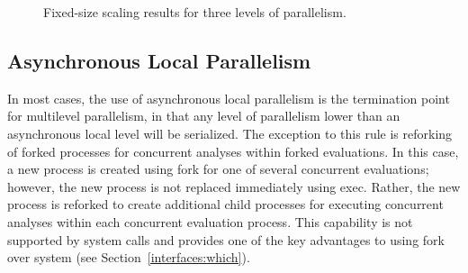 \begin{figure}
  \centering
  \caption{Fixed-size scaling results for three levels of parallelism.}
  \label{fig:mlp_scaling}
\end{figure}

\subsection{Asynchronous Local Parallelism}\label{parallel:MLP:local}

In most cases, the use of asynchronous local parallelism is the
termination point for multilevel parallelism, in that any level of
parallelism lower than an asynchronous local level will be serialized.
The exception to this rule is reforking of forked processes for
concurrent analyses within forked evaluations.  In this case, a new
process is created using fork for one of several concurrent
evaluations; however, the new process is not replaced immediately
using exec.  Rather, the new process is reforked to create additional
child processes for executing concurrent analyses within each
concurrent evaluation process.  This capability is not supported by
system calls and provides one of the key advantages to using fork over
system (see Section~\ref{interfaces:which}).

